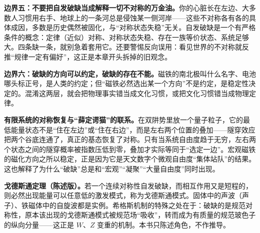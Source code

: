 \begin{mainline}
\textbf{边界五：不要把自发破缺当成解释一切不对称的万金油。}你的心脏长在左边、大多数人习惯用右手、地球上的一条河总是侵蚀某一侧河岸——这些不对称各有各的具体成因，多数是历史偶然被固化，与“对称状态失稳”无关。自发破缺是一个有严格条件的概念：定律（近似）对称、对称状态失稳、存在一族等价状态、系统足够大。四条缺一条，就别急着套用它。还要警惕反向误用：看见世界的不对称就反推“规律一定有偏好”，这正是本章开头拆掉的旧观念。

\textbf{边界六：破缺的方向可以约定，破缺的存在不能。}磁铁的南北极叫什么名字、电池哪头标正号，是人类的约定；但“磁铁必然选出某一个方向”不是约定，是稳定性决定的。混淆这两层，就会把物理事实错当成文化习惯，或把文化习惯错当成物理定律。
\end{mainline}

\begin{challenge}
\textbf{有限系统的对称恢复与“薛定谔猫”的联系。}在双阱势里放一个量子粒子，它的最低能量状态不是“住在左边”或“住在右边”，而是左右两个位置的叠加——隧穿效应把两个谷底连通了，真正的基态恢复了对称。只有当系统自由度趋于无穷，左右两个状态之间的隧穿概率被指数压低到零，叠加才实际等同于“选定一边”。宏观磁铁的磁化方向之所以稳定，正是因为它是天文数字个微观自由度“集体站队”的结果。这也解释了为什么“破缺”总是和“宏观”“凝聚”“大量自由度”同时出现。

\textbf{戈德斯通定理（陈述版）。}若一个连续对称性自发破缺，而相互作用又是短程的，则必然出现能量可以任意低的激发模式，称为戈德斯通模式。固体中的声波（声子）、铁磁体中的自旋波都是实例。希格斯机制的特殊之处在于：破缺的是规范对称性，原本该出现的戈德斯通模式被规范场“吸收”，转而成为有质量的规范玻色子的纵向分量——这正是 \(W\)、\(Z\) 变重的机制。本书只陈述角色，不作推导。
\end{challenge}


